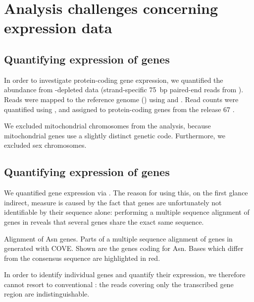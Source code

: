 \chapter{Analysis challenges concerning  expression data}
\label{sec:trna-analysis}

\section{Quantifying expression of \mrna genes}

In order to investigate protein-coding gene expression, we quantified the \mrna
abundance from \rrna-depleted \rnaseq data (strand-specific \SI{75}{bp}
paired-end reads from  ). Reads were mapped to
the \mmu reference genome () using 
\citep{Fonseca:2014} and  \citep{Kim:2013}. Read counts were
quantified using  \citep{Anders:2014}, and assigned to
protein-coding genes from the  release \num{67}
\citep{Flicek:2014}.

We excluded mitochondrial chromosomes from the analysis, because mitochondrial
genes use a slightly distinct genetic code. Furthermore, we excluded
sex chromosomes.

\section{Quantifying expression of \trna genes}

We quantified \trna gene expression via  \chipseq. The reason for using
this, on the first glance indirect, measure is caused by the fact that \trna
genes are unfortunately not identifiable by their sequence alone: performing a
multiple sequence alignment of \trna genes in \mmu reveals that several \trna
genes share the exact same sequence.

    {\footnotesize}
    {Alignment of Asn \trna genes.}
    {Parts of a multiple sequence alignment of \trna genes in \mmu generated
    with COVE\@. Shown are the \trna genes coding for Asn. Bases which differ
    from the consensus sequence are highlighted in red.}

In order to identify individual \trna genes and quantify their expression, we
therefore cannot resort to conventional \rnaseq: the \rna reads covering only
the transcribed gene region are indistinguishable.


